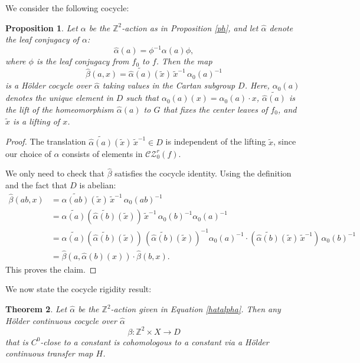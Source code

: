 \documentclass[11pt]{amsart}
\numberwithin{equation}{section}
\newcommand{\Z}{\mathbb{Z}}
\newcommand{\CZ}{\mathcal{CZ}}
\theoremstyle{plain}
\newtheorem{thm}{Theorem}[section]
\newtheorem{prop}[thm]{Proposition}
\begin{document}
We consider the following cocycle:

\begin{prop}
Let $\alpha$ be the $\Z^2$-action as in Proposition \ref{ph}, and let $\hat{\alpha}$ denote the leaf conjugacy of $\alpha$:
\begin{equation}\label{hatalpha}
\hat{\alpha}(a) = \phi^{-1} \alpha(a) \phi,
\end{equation}
where $\phi$ is the leaf conjugacy from $f_0$ to $f$. Then the map
\begin{equation}\label{cocbeta}
\hat{\beta}(a, x) = \widetilde{\hat{\alpha}(a)}(\tilde x) \, \tilde x^{-1} \, \alpha_0(a)^{-1}
\end{equation}
is a H\"older cocycle over $\hat{\alpha}$ taking values in the Cartan subgroup $D$. Here, $\alpha_0(a)$ denotes the unique element in $D$ such that $\alpha_0(a)(x) = \alpha_0(a) \cdot x$, $\widetilde{\hat{\alpha}(a)}$ is the lift of the homeomorphism $\hat{\alpha}(a)$ to $G$ that fixes the center leaves of $f_0$, and $\tilde x$ is a lifting of $x$.
\end{prop}

\begin{proof}
The translation $\widetilde{\hat{\alpha}(a)}(\tilde x) \, \tilde x^{-1}\in D$ is independent of the lifting $\tilde x$, since our choice of $\alpha$ consists of elements in $\CZ^r_0(f)$.

We only need to check that $\hat{\beta}$ satisfies the cocycle identity. Using the definition and the fact that $D$ is abelian:
\[
\begin{aligned}
\hat{\beta}(ab, x) &= \widetilde{\hat{\alpha}(ab)}(\tilde x) \, \tilde x^{-1} \, \alpha_0(ab)^{-1} \\
&= \widetilde{\hat{\alpha}(a)}(\widetilde{\hat{\alpha}(b)}(\tilde x)) \, \tilde x^{-1} \, \alpha_0(b)^{-1} \alpha_0(a)^{-1} \\
&= \widetilde{\hat{\alpha}(a)}(\widetilde{\hat{\alpha}(b)}(\tilde x)) \, (\widetilde{\hat{\alpha}(b)}(\tilde x))^{-1} \alpha_0(a)^{-1} \cdot (\widetilde{\hat{\alpha}(b)}(\tilde x) \, \tilde x^{-1}) \, \alpha_0(b)^{-1} \\
&= \hat{\beta}(a, \hat{\alpha}(b)(x)) \cdot \hat{\beta}(b,  x).
\end{aligned}
\]
This proves the claim.
\end{proof}

We now state the cocycle rigidity result:

\begin{thm}\label{cocrig}
Let $\hat{\alpha}$ be the $\Z^2$-action given in Equation \eqref{hatalpha}. Then any H\"older continuous cocycle over $\hat{\alpha}$
\[
\beta: \Z^2 \times X \to D
\]
that is $C^0$-close to a constant is cohomologous to a constant via a H\"older continuous transfer map $H$.
\end{thm}
\end{document}
